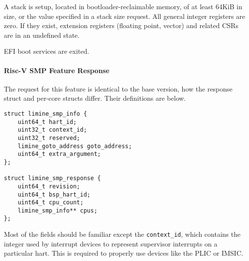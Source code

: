A stack is setup, located in bootloader-reclaimable memory, of at least 64KiB in size, or the value specified in a stack size request. All general integer registers are zero. If they exist, extension registers (floating point, vector) and related CSRs are in an undefined state.

EFI boot services are exited.

\paragraph{Risc-V SMP Feature Response}
The request for this feature is identical to the base version, how the response struct and per-core structs differ. Their definitions are below.

\begin{verbatim}
struct limine_smp_info {
    uint64_t hart_id;
    uint32_t context_id;
    uint32_t reserved;
    limine_goto_address goto_address;
    uint64_t extra_argument;
};

struct limine_smp_response {
    uint64_t revision;
    uint64_t bsp_hart_id;
    uint64_t cpu_count;
    limine_smp_info** cpus;
};
\end{verbatim}

Most of the fields should be familiar except the \verb|context_id|, which contains the integer used by interrupt devices to represent supervisor interrupts on a particular hart. This is required to properly use devices like the PLIC or IMSIC. 
